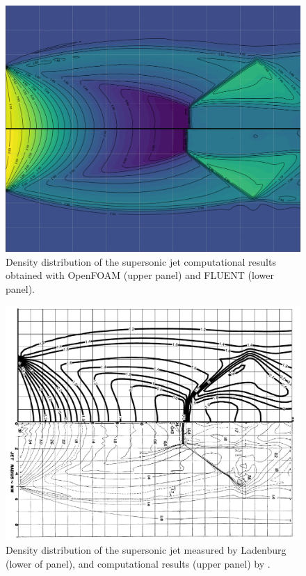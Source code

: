 \documentclass[12pt]{article}
\begin{document}
\begin{figure}[H]
    \centering
    \includegraphics[width=\linewidth]{figs/stacked_rho_OF_vs_FLUENT_viridis.png}
    \caption{Density distribution of the supersonic jet computational results obtained with OpenFOAM (upper panel) and FLUENT (lower panel). %
    }
    \label{fig:rho_OF_vs_FLUENT_viridis}
\end{figure}

\begin{figure}[H]
    \centering
    \includegraphics[width=0.775\linewidth]{figs/comp1.png}
    \caption{Density distribution of the supersonic jet measured by Ladenburg~\cite{ladenburg1949interferometric} (lower of panel), and computational results (upper panel) by \cite{kumar2021role}.%
    }
    \label{fig:comp1}
\end{figure}
\end{document}
